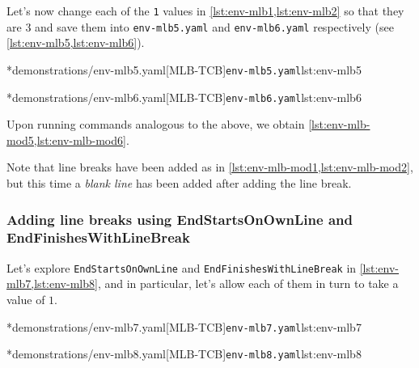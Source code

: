 	Let's%
	  now change each of the \texttt{1} values in \cref{lst:env-mlb1,lst:env-mlb2} so that they are $3$ and
	save them into \texttt{env-mlb5.yaml} and \texttt{env-mlb6.yaml} respectively (see \cref{lst:env-mlb5,lst:env-mlb6}).

	\begin{minipage}{.45\textwidth}
		\cmhlistingsfromfile[style=yaml-LST]*{demonstrations/env-mlb5.yaml}[MLB-TCB]{\texttt{env-mlb5.yaml}}{lst:env-mlb5}
	\end{minipage}
	\hfill
	\begin{minipage}{.45\textwidth}
		\cmhlistingsfromfile[style=yaml-LST]*{demonstrations/env-mlb6.yaml}[MLB-TCB]{\texttt{env-mlb6.yaml}}{lst:env-mlb6}
	\end{minipage}

	Upon running  commands analogous to the above, we obtain \cref{lst:env-mlb-mod5,lst:env-mlb-mod6}.

	\begin{widepage}
		\begin{minipage}{.56\linewidth}
		\end{minipage}
		\hfill
		\begin{minipage}{.43\linewidth}
		\end{minipage}
	\end{widepage}

	Note that line breaks have been added as in \cref{lst:env-mlb-mod1,lst:env-mlb-mod2}, but this time a \emph{blank line}
	has been added after adding the line break.

\subsubsection{Adding line breaks using EndStartsOnOwnLine and EndFinishesWithLineBreak}
	Let's explore \texttt{EndStartsOnOwnLine} and \texttt{EndFinishesWithLineBreak} in \cref{lst:env-mlb7,lst:env-mlb8},
	and in particular, let's allow each of them in turn to take a value of $1$.

	\begin{minipage}{.49\textwidth}
		\cmhlistingsfromfile[style=yaml-LST]*{demonstrations/env-mlb7.yaml}[MLB-TCB]{\texttt{env-mlb7.yaml}}{lst:env-mlb7}
	\end{minipage}
	\hfill
	\begin{minipage}{.49\textwidth}
		\cmhlistingsfromfile[style=yaml-LST]*{demonstrations/env-mlb8.yaml}[MLB-TCB]{\texttt{env-mlb8.yaml}}{lst:env-mlb8}
	\end{minipage}

